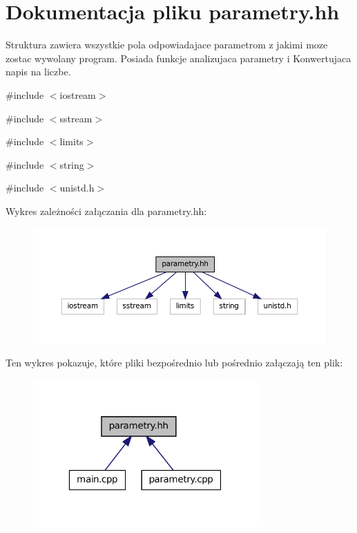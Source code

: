 \hypertarget{parametry_8hh}{
\section{Dokumentacja pliku parametry.hh}
\label{parametry_8hh}
}


Struktura zawiera wszystkie pola odpowiadajace parametrom z jakimi moze zostac wywolany program. Posiada funkcje analizujaca parametry i Konwertujaca napis na liczbe.  


{\ttfamily \#include $<$iostream$>$}\par
{\ttfamily \#include $<$sstream$>$}\par
{\ttfamily \#include $<$limits$>$}\par
{\ttfamily \#include $<$string$>$}\par
{\ttfamily \#include $<$unistd.h$>$}\par
Wykres zależności załączania dla parametry.hh:\nopagebreak
\begin{figure}[H]
\begin{center}
\leavevmode
\includegraphics[width=400pt]{parametry_8hh__incl}
\end{center}
\end{figure}
Ten wykres pokazuje, które pliki bezpośrednio lub pośrednio załączają ten plik:\nopagebreak
\begin{figure}[H]
\begin{center}
\leavevmode
\includegraphics[width=244pt]{parametry_8hh__dep__incl}
\end{center}
\end{figure}
